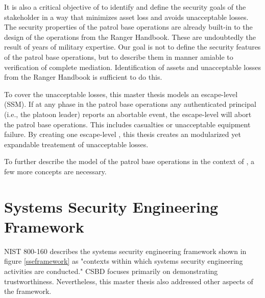 \documentclass[../../main/main.tex]{subfiles}
\begin{document}
It is also a critical objective of  to identify and define the security goals of the stakeholder in a way that minimizes asset loss and avoids unacceptable losses.  The security properties of the patrol base operations are already built-in to the design of the operations from the Ranger Handbook.  These are undoubtedly the result of years of military expertise.  Our goal is not to define the security features of the patrol base operations, but to describe them in manner amiable to verification of complete mediation.  Identification of assets and unacceptable losses from the Ranger Handbook is sufficient to do this.

To cover the unacceptable losses, this master thesis models an escape-level  (SSM).  If at any phase in the patrol base operations any authenticated principal (i.e., the platoon leader) reports an abortable event, the escape-level  will abort the patrol base operations. This includes casualties or unacceptable equipment failure.  By creating one escape-level , this thesis creates an modularized yet expandable treatement of unacceptable losses.


To further describe the model of the patrol base operations in the context of , a few more concepts are necessary.  

\section{Systems Security Engineering Framework}\label{sssec:sseframework}
NIST 800-160 describes the systems security engineering framework shown in figure \ref{sseframework} as "contexts within which systems security engineering activities are conducted."  CSBD focuses primarily on demonstrating trustworthiness.  Nevertheless, this master thesis also addressed other aspects of the framework.  
\end{document}
